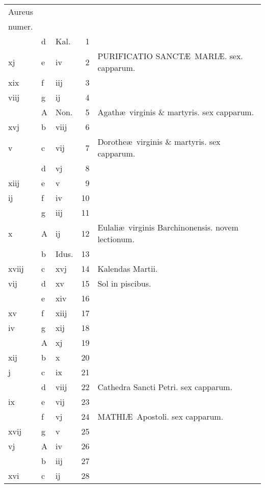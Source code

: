 \documentclass[letter,11pt]{book}
\begin{document}
\begin{center}
\begin{tabular}{l | l | l | r | l}
\color{Red}Aureus & & & \\
\color{Red}numer. & & & \\
 & d & \color{Red} Kal. & 1 & \\
\color{Red} xj & e & \color{Red} iv & 2 & \color{Red} PURIFICATIO SANCT\AE \ MARI\AE . \color{black} sex. capparum. \\
\color{Red} xix & f & \color{Red} iij & 3 & \\
\color{Red} viij & g & \color{Red} ij & 4 & \\
 & \color{Red} A & Non. & 5 & Agath\ae \ virginis \& martyris. \color{Red} sex capparum. \\
\color{Red} xvj & b & \color{Red} viij & 6 & \\
\color{Red} v & c & \color{Red} vij & 7 & Dorothe\ae \ virginis \& martyris. \color{Red} sex capparum. \\
\color{Red}  & d & \color{Red} vj & 8 & \\
\color{Red} xiij & e & \color{Red} v & 9 & \\
\color{Red} ij & f & \color{Red} iv & 10 & \\
\color{Red}  & g & \color{Red} iij & 11 & \\
\color{Red} x & \color{Red} A & \color{Red} ij & 12 & Eulali\ae \ virginis Barchinonensis. \color{Red} novem lectionum. \\
\color{Red}  & b & Idus. & 13 & \\
\color{Red} xviij & c & \color{Red} xvj & 14 & \quad \color{Red} Kalendas Martii. \\
\color{Red} vij & d & \color{Red} xv & 15 & \qquad \color{Red} Sol in piscibus. \\
\color{Red}  & e & \color{Red} xiv & 16 & \\
\color{Red} xv & f & \color{Red} xiij & 17 & \\
\color{Red} iv & g & \color{Red} xij & 18 & \\
\color{Red}  & \color{Red} A & \color{Red} xj & 19 & \\
\color{Red} xij & b & \color{Red} x & 20 & \\
\color{Red} j & c & \color{Red} ix & 21 & \\
\color{Red}  & d & \color{Red} viij & 22 & \color{Red} Cathedra Sancti Petri. \color{black} sex capparum. \\
\color{Red} ix & e & \color{Red} vij & 23 & \\
\color{Red}  & f & \color{Red} vj & 24 & \color{Red} MATHI\AE \ Apostoli. \color{black} sex capparum. \\
\color{Red} xvij & g & \color{Red} v & 25 & \\
\color{Red} vj & \color{Red} A & \color{Red} iv & 26 & \\
\color{Red}  & b & \color{Red} iij & 27 & \\
\color{Red} xvi & c & \color{Red} ij & 28 & \\
\hline
\end{tabular}
\end{center}
\end{document}
